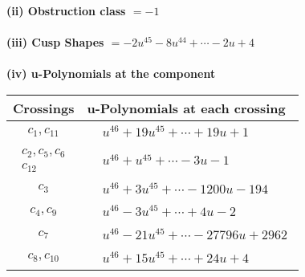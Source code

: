 \documentclass[1p]{elsarticle_modified}
\theoremstyle{definition}
\begin{document}
\flushleft \textbf{(ii) Obstruction class $= -1$}\\~\\
\flushleft \textbf{(iii) Cusp Shapes $= -2 u^{45}-8 u^{44}+\cdots-2 u+4$}\\~\\
\newpage\renewcommand{\arraystretch}{1}
\flushleft \textbf{(iv) u-Polynomials at the component}\newline \\
\begin{tabular}{m{50pt}|m{274pt}}
Crossings & \hspace{64pt}u-Polynomials at each crossing \\
\hline $$\begin{aligned}c_{1},c_{11}\end{aligned}$$&$\begin{aligned}
&u^{46}+19 u^{45}+\cdots+19 u+1
\end{aligned}$\\
\hline $$\begin{aligned}c_{2},c_{5},c_{6}\\c_{12}\end{aligned}$$&$\begin{aligned}
&u^{46}+u^{45}+\cdots-3 u-1
\end{aligned}$\\
\hline $$\begin{aligned}c_{3}\end{aligned}$$&$\begin{aligned}
&u^{46}+3 u^{45}+\cdots-1200 u-194
\end{aligned}$\\
\hline $$\begin{aligned}c_{4},c_{9}\end{aligned}$$&$\begin{aligned}
&u^{46}-3 u^{45}+\cdots+4 u-2
\end{aligned}$\\
\hline $$\begin{aligned}c_{7}\end{aligned}$$&$\begin{aligned}
&u^{46}-21 u^{45}+\cdots-27796 u+2962
\end{aligned}$\\
\hline $$\begin{aligned}c_{8},c_{10}\end{aligned}$$&$\begin{aligned}
&u^{46}+15 u^{45}+\cdots+24 u+4
\end{aligned}$\\
\hline
\end{tabular}\\~\\
\end{document}
